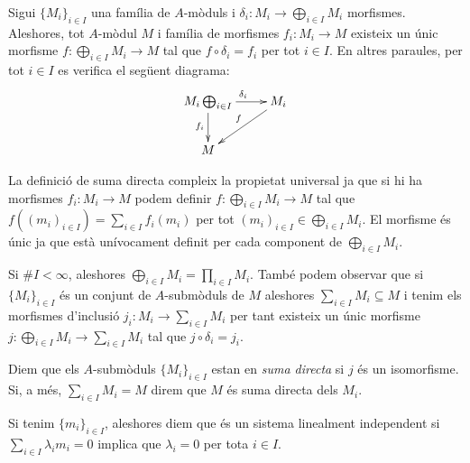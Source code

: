 \documentclass[../../../main.tex]{subfiles}
\begin{document}
\begin{prop}
\label{prop:propietatUniversalSumaDirecta} Sigui $\{M_i\}_{i\in I}$ una família de $A$-mòduls i $\delta_i:M_i\to \bigoplus_{i\in I}M_i$ morfismes. Aleshores, tot $A$-mòdul $M$ i família de morfismes $f_i:M_i\to M$ existeix un únic morfisme $f:\bigoplus_{i\in I}M_i\to M$ tal que $f\circ\delta_i = f_i$ per tot $i\in I$. En altres paraules, per tot $i\in I$ es verifica el següent diagrama:
\begin{equation}
    \notag
    \xymatrix{
    M_i\ar[d]_{f_i}\ar[r]^{\delta_i}\bigoplus_{i\in I}&M_i \ar[dl]_f\\
    M & 
    }
\end{equation}
\end{prop}

\begin{nota}
La definició de suma directa compleix la propietat universal ja que si hi ha morfismes $f_i:M_i\to M$ podem definir $f:\bigoplus_{i\in I}M_i\to M$ tal que $f((m_i)_{i\in I}) = \sum_{i\in I}f_i(m_i)$ per tot $(m_i)_{i\in I}\in \bigoplus_{i\in I}M_i$. El morfisme és únic ja que està unívocament definit per cada component de $\bigoplus_{i\in I}M_i$.
\end{nota}


\begin{nota}
Si $\#I<\infty$, aleshores $\bigoplus_{i\in I}M_i = \prod_{i\in I}M_i$. També podem observar que si $\{M_i\}_{i\in I}$ és un conjunt de $A$-submòduls de $M$ aleshores $\sum_{i\in I}M_i\subseteq M$ i tenim els morfismes d'inclusió $j_i:M_i\to \sum_{i\in I}M_i$ per tant existeix un únic morfisme $j:\bigoplus_{i\in I}M_i\to \sum_{i\in I}M_i$ tal que $j\circ \delta_i = j_i$.
\end{nota}

\begin{defi}\label{def:sumaDirecta}
Diem que els $A$-submòduls $\{M_i\}_{i\in I}$ estan en \textit{suma directa} si $j$ és un isomorfisme. Si, a més, $\sum_{i\in I}M_i= M$ direm que $M$ és suma directa dels $M_i$.
\end{defi}

\begin{defi}
\label{def:sistemesdelementslinealmentindependnets} Si tenim $\{m_i\}_{i\in I}$, aleshores diem que és un sistema linealment independent si $\sum_{i\in I}\lambda_im_i=0$ implica que $\lambda_i = 0$ per tota $i\in I$.
\end{defi}
\end{document}

